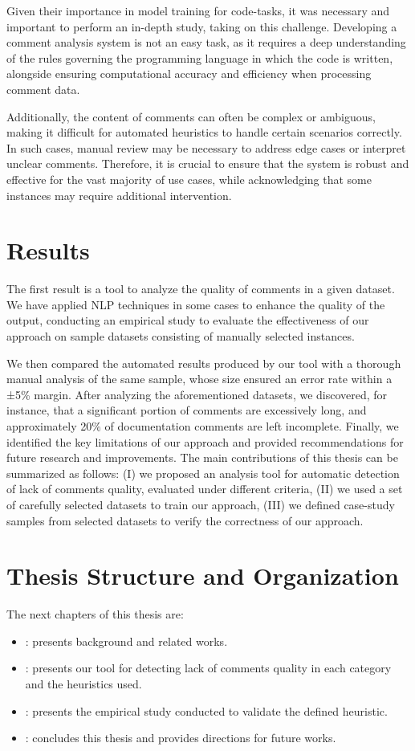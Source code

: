 \noindent Given their importance in model training for code-tasks, it was necessary and important to perform an in-depth study, taking on this challenge. Developing a comment analysis system \cite{commentAnalysis} is not an easy task, as it requires a deep understanding of the rules governing the programming language in which the code is written, alongside ensuring computational accuracy and efficiency when processing comment data.

\noindent Additionally, the content of comments can often be complex or ambiguous, making it difficult for automated heuristics to handle certain scenarios correctly. In such cases, manual review may be necessary to address edge cases or interpret unclear comments.
Therefore, it is crucial to ensure that the system is robust and effective for the vast majority of use cases, while acknowledging that some instances may require additional intervention.

\section{Results}
The first result is a tool to analyze the quality of comments in a given dataset. We have applied NLP techniques in some cases to enhance the quality of the output, conducting an empirical study to evaluate the effectiveness of our approach on sample datasets consisting of manually selected instances.

\noindent We then compared the automated results produced by our tool with a thorough manual analysis of the same sample, whose size ensured an error rate within a ±5\% margin.
After analyzing the aforementioned datasets, we discovered, for instance, that a significant portion of comments are excessively long, and approximately 20\% of documentation comments are left incomplete. Finally, we identified the key limitations of our approach and provided recommendations for future research and improvements. The main contributions of this thesis can be summarized as follows:
(I) we proposed an analysis tool for automatic detection of lack of comments quality, evaluated under different criteria,
(II) we used a set of carefully selected datasets to train our approach,
(III) we defined case-study samples from selected datasets to verify the correctness of our approach.

\section{Thesis Structure and Organization}
The next chapters of this thesis are:

\begin{itemize}
\item {}: presents background and related works.
\item {}: presents our tool for detecting lack of comments quality in each category and the heuristics used.
\item {}: presents the empirical study conducted to validate the
defined heuristic.
\item {}: concludes this thesis and provides directions for future works.
\end{itemize}